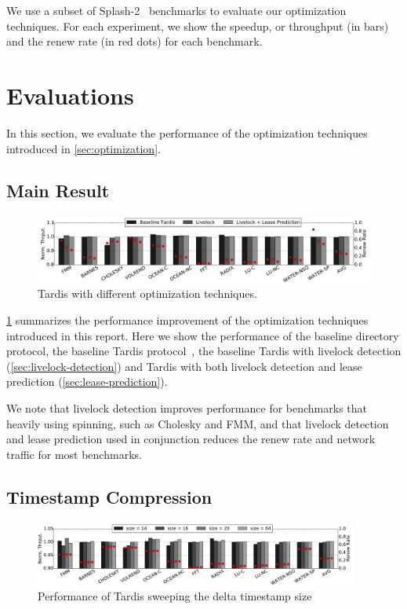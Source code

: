 \documentclass[12pt]{article}
\newcommand{\red}[1]{\textcolor{red}{#1}}
\begin{document}
	We use a subset of Splash-2~\cite{splash2} benchmarks to evaluate our 
	optimization techniques. For each experiment, we show the speedup, or 
	throughput (in bars) and the renew rate (in red dots) for each 
	benchmark.
	
	\section{Evaluations}
	
	In this section, we evaluate the performance of the optimization 
	techniques introduced in \cref{sec:optimization}.
	
	\subsection{Main Result}
	
	\begin{figure}
		\centering
		\includegraphics[width=0.95\columnwidth]{figs/main.pdf}
		\caption{ Tardis with different optimization techniques.}
		\label{fig:main}
	\end{figure}
	
	\cref{fig:main} summarizes the performance improvement of the 
	optimization techniques introduced in this report. Here we show the 
	performance of the baseline directory protocol, the baseline Tardis protocol~\cite{tardis}, the baseline Tardis with livelock 
	detection (\cref{sec:livelock-detection}) and Tardis with both livelock 
	detection and lease prediction (\cref{sec:lease-prediction}).
	
	
	We note that livelock detection improves performance for benchmarks that heavily using spinning, such as Cholesky and FMM, and that livelock detection and lease prediction used in conjunction reduces the renew rate and network traffic for most benchmarks.
	
	\subsection{Timestamp Compression}
	
	\begin{figure}
		\centering
		\includegraphics[width=0.95\textwidth]{figs/tssize.pdf}
		\caption{ Performance of Tardis sweeping the delta timestamp size}
		\label{fig:tssize}
	\end{figure}
	
\end{document}
